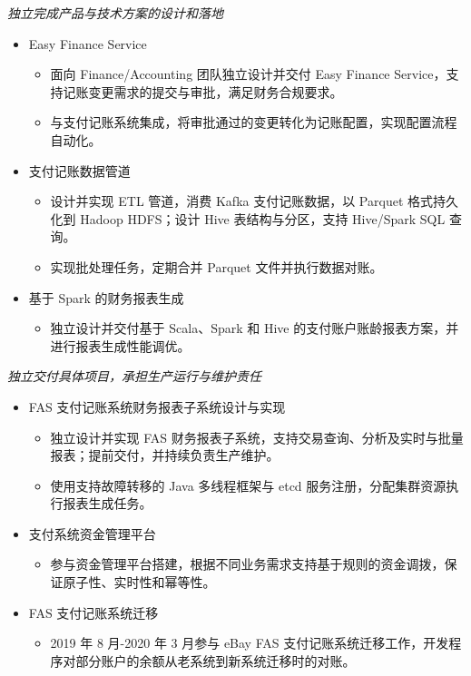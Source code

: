 \documentclass{resume}
\begin{document}
\textit{独立完成产品与技术方案的设计和落地}
\begin{itemize}
  \item Easy Finance Service
  \begin{itemize}
    \item[。] 面向 Finance/Accounting 团队独立设计并交付 Easy Finance Service，支持记账变更需求的提交与审批，满足财务合规要求。
    \item[。] 与支付记账系统集成，将审批通过的变更转化为记账配置，实现配置流程自动化。
  \end{itemize}
  \item 支付记账数据管道
  \begin{itemize}
    \item[。] 设计并实现 ETL 管道，消费 Kafka 支付记账数据，以 Parquet 格式持久化到 Hadoop HDFS；设计 Hive 表结构与分区，支持 Hive/Spark SQL 查询。
    \item[。] 实现批处理任务，定期合并 Parquet 文件并执行数据对账。
  \end{itemize}
  \item 基于 Spark 的财务报表生成
  \begin{itemize}
    \item[。] 独立设计并交付基于 Scala、Spark 和 Hive 的支付账户账龄报表方案，并进行报表生成性能调优。
  \end{itemize}
\end{itemize}

\textit{独立交付具体项目，承担生产运行与维护责任}
\begin{itemize}
  \item FAS 支付记账系统财务报表子系统设计与实现
  \begin{itemize}
    \item[。] 独立设计并实现 FAS 财务报表子系统，支持交易查询、分析及实时与批量报表；提前交付，并持续负责生产维护。
    \item[。] 使用支持故障转移的 Java 多线程框架与 etcd 服务注册，分配集群资源执行报表生成任务。
  \end{itemize}
  \item 支付系统资金管理平台
  \begin{itemize}
    \item[。] 参与资金管理平台搭建，根据不同业务需求支持基于规则的资金调拨，保证原子性、实时性和幂等性。
  \end{itemize}
  \item FAS 支付记账系统迁移
  \begin{itemize}
    \item[。] 2019 年 8 月-2020 年 3 月参与 eBay FAS 支付记账系统迁移工作，开发程序对部分账户的余额从老系统到新系统迁移时的对账。
  \end{itemize}
\end{itemize}
\end{document}
